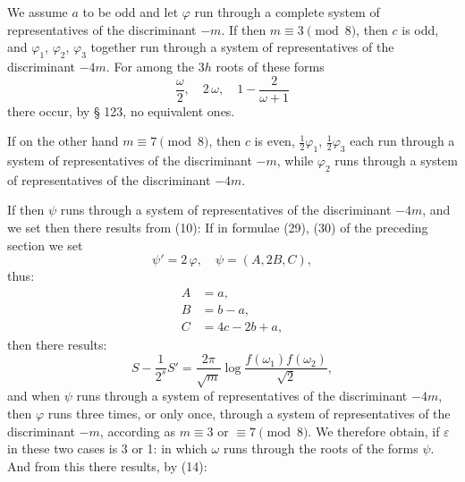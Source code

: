 
We assume $a$ to be odd and let $\varphi$ run through a complete
system of representatives of the discriminant $-m$. If
then $m \equiv 3 \pmod 8$, then $c$ is odd, and $\varphi_1$, $\varphi_2$, $\varphi_3$
together run through a system of representatives of the discriminant $-4m$. For among the $3h$ roots of these forms
\[
\frac{\omega}{2}, \quad 2\,\omega, \quad 1 - \frac{2}{\omega+1}
\]
there occur, by § 123, no equivalent ones.

If on the other hand $m \equiv 7 \pmod 8$, then $c$ is even, $\frac{1}{2}\varphi_1$, $\frac{1}{2}\varphi_3$ each run through a system of representatives of the discriminant $-m$, while $\varphi_2$
runs through a system of representatives of the discriminant $-4m$.

If then $\psi$ runs through a system of representatives of the discriminant $-4m$, and we set
then there results from (10):
If in formulae (29), (30) of the preceding section we set
\[
\psi' = 2\,\varphi, \quad \psi = (A, 2B, C),
\]
thus:
\[
\begin{aligned}
A &= a, \\
B &= b - a, \\
C &= 4c - 2b + a,
\end{aligned}
\]
then there results:
\[
S - \frac{1}{2^s} S' = \frac{2\pi}{\sqrt{m}} \log \frac{f(\omega_1)f(\omega_2)}{\sqrt{2}},
\]
and when $\psi$ runs through a system of representatives of the discriminant $-4m$,
then $\varphi$ runs three times, or only once, through a system of representatives of the discriminant $-m$, according as $m \equiv 3$
or $\equiv 7 \pmod 8$. We therefore obtain, if $\varepsilon$ in these
two cases is 3 or 1:
in which $\omega$ runs through the roots of the forms $\psi$. And from this
there results, by (14):
